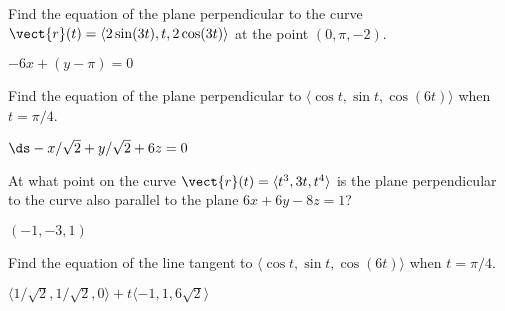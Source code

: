 \begin{enumialphparenastyle}
\begin{ex}
Find the equation of the plane perpendicular to the curve $\vect{r}(t)
 = \langle 2\sin(3t),t,2\cos(3t)\rangle$ at the point $(0,\pi,-2)$.
\begin{sol} $-6x+(y-\pi)=0$
\end{sol}
\end{ex}

\begin{ex}
Find the equation of the plane perpendicular to 
$\langle \cos t, \sin t, \cos(6t)\rangle$ when $t=\pi/4$.
\begin{sol} $\ds -x/\sqrt2+y/\sqrt2+6z=0$
\end{sol}
\end{ex}

\begin{ex}
At what point on the curve 
$\vect{r}(t) = \langle t^3,3t,t^4\rangle$ is the
plane perpendicular to the curve also parallel to the plane $6x+6y-8z=1$?
\begin{sol} $(-1,-3,1)$
\end{sol}
\end{ex}

\begin{ex}
Find the equation of the line tangent to 
$\langle \cos t, \sin t, \cos(6t)\rangle$ when $t=\pi/4$.
\begin{sol} $\langle 1/\sqrt2,1/\sqrt2,0\rangle+t\langle -1,1,6\sqrt2\rangle$
\end{sol}
\end{ex}

\end{enumialphparenastyle}
